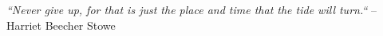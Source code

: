 \thispagestyle{empty}

\null\vfill

\begin{center}
\emph{``Never give up, for that is just the place and time that the tide will turn.``} -- Harriet Beecher Stowe
\end{center}

\vspace{10cm}

\clearpage
